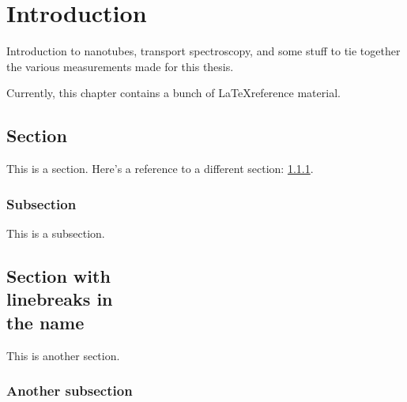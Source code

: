 \chapter{Introduction}
\label{sec:intro}

Introduction to nanotubes, transport spectroscopy, and some stuff to tie together the various measurements made for this thesis.

Currently, this chapter contains a bunch of \LaTeX reference material.

\section{Section}
\label{sec:section}

This is a section.  Here's a reference to a different section:
\ref{sec:subsection}.

\subsection{Subsection}
\label{sec:subsection}

This is a subsection.

% 

\section[Optional table of contents heading]{Section with\\linebreaks in\\the
name}

This is another section.

\subsection{Another subsection}


